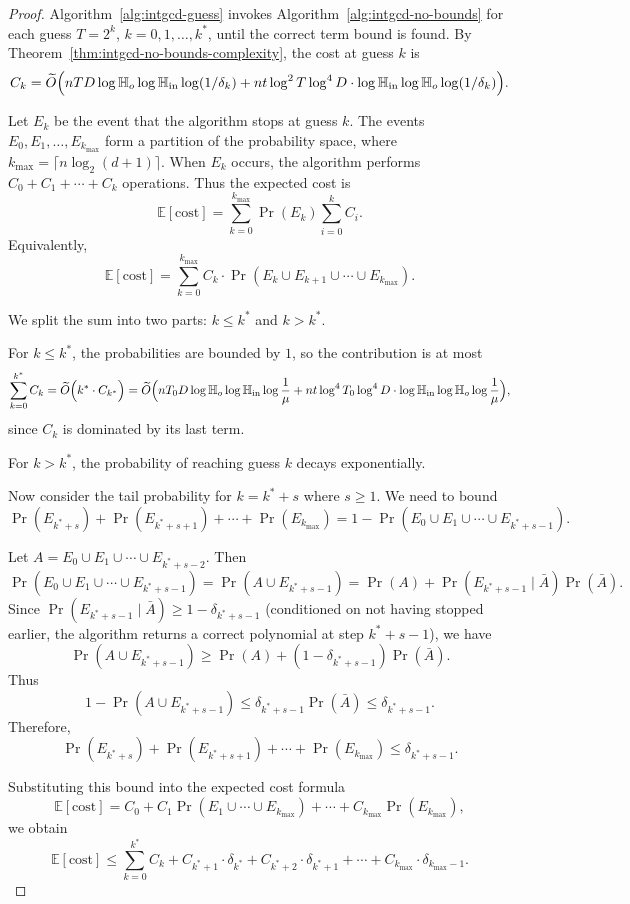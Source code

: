 \documentclass{article}
\numberwithin{equation}{section}
\begin{document}
\begin{proof}
Algorithm~\ref{alg:intgcd-guess} invokes Algorithm~\ref{alg:intgcd-no-bounds} for each guess $T = 2^k$, $k = 0, 1, \dots, k^*$, until the correct term bound is found. 
By Theorem~\ref{thm:intgcd-no-bounds-complexity}, the cost at guess $k$ is
\[
C_k = 
\widetilde{O}\Bigl(
nTD\log\mathbb{H}_{o}\log\mathbb{H}_{\rm in}\log(1/\delta_k)
+ n t \log^2 T\log^4 D \cdot \log \mathbb{H}_{\rm in} \log\mathbb{H}_{o}\log(1/\delta_k)
\Bigr).
\]
%

Let $E_k$ be the event that the algorithm stops at guess $k$. The events $E_0, E_1, \dots, E_{k_{\max}}$ form a partition of the probability space, where $k_{\max}=\lceil n\log_2(d+1)\rceil$. When $E_k$ occurs, the algorithm performs $C_0 + C_1 + \cdots + C_k$ operations. Thus the expected cost is
\[
\mathbb{E}[\text{cost}]
= \sum_{k=0}^{k_{\max}} \Pr(E_k) \sum_{i=0}^{k} C_i.
\]
Equivalently,
\[
\mathbb{E}[\text{cost}]
= \sum_{k=0}^{k_{\max}} C_k \cdot \Pr(E_k \cup E_{k+1} \cup \cdots \cup E_{k_{\max}}).
\]

We split the sum into two parts: $k \le k^*$ and $k > k^*$.

For $k \le k^*$, the probabilities are bounded by $1$, so the contribution is at most
\[
\sum_{k=0}^{k^*} C_k 
= \widetilde{O}\Bigl( k^* \cdot C_{k^*} \Bigr)
= \widetilde{O}\Bigl( 
nT_0 D\log\mathbb{H}_{o}\log\mathbb{H}_{\rm in}\log\frac{1}{\mu}
+ n t \log^4 T_0\log^4 D \cdot \log \mathbb{H}_{\rm in} \log\mathbb{H}_{o}\log\frac{1}{\mu}
\Bigr),
\]
since $C_k$ is dominated by its last term.

For $k > k^*$, the probability of reaching guess $k$ decays exponentially. 


Now consider the tail probability for $k = k^* + s$ where $s \ge 1$. We need to bound
\[
\Pr(E_{k^*+s}) + \Pr(E_{k^*+s+1}) + \cdots + \Pr(E_{k_{\max}})
= 1 - \Pr(E_0 \cup E_1 \cup \cdots \cup E_{k^*+s-1}).
\]

Let $A = E_0 \cup E_1 \cup \cdots \cup E_{k^*+s-2}$. Then
\[
\Pr(E_0 \cup E_1 \cup \cdots \cup E_{k^*+s-1})=\Pr(A \cup E_{k^*+s-1})
= \Pr(A) + \Pr(E_{k^*+s-1} \mid \bar{A}) \Pr(\bar{A}).
\]
Since $\Pr(E_{k^*+s-1} \mid \bar{A}) \ge 1 - \delta_{k^*+s-1}$ (conditioned on not having stopped earlier, the algorithm returns a correct polynomial at step $k^*+s-1$), we have
\[
\Pr(A \cup E_{k^*+s-1})
\ge \Pr(A) + (1 - \delta_{k^*+s-1}) \Pr(\bar{A}).
\]
Thus
\[
1 - \Pr(A \cup E_{k^*+s-1})
\le \delta_{k^*+s-1} \Pr(\bar{A})
\le \delta_{k^*+s-1}.
\]
Therefore,
\[
\Pr(E_{k^*+s}) + \Pr(E_{k^*+s+1}) + \cdots + \Pr(E_{k_{\max}})
\le \delta_{k^*+s-1}.
\]

Substituting this bound into the expected cost formula
\[
\mathbb{E}[\text{cost}]
= C_0 + C_1 \Pr(E_1 \cup \cdots \cup E_{k_{\max}}) + \cdots + C_{k_{\max}} \Pr(E_{k_{\max}}),
\]
we obtain
\[
\mathbb{E}[\text{cost}]
\le \sum_{k=0}^{k^*} C_k
+ C_{k^*+1} \cdot \delta_{k^*}
+ C_{k^*+2} \cdot \delta_{k^*+1}
+ \cdots + C_{k_{\max}} \cdot \delta_{k_{\max}-1}.
\]


\end{proof}
\end{document}
